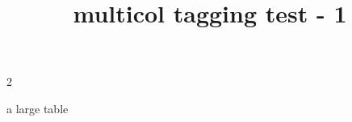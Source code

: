\documentclass{article}
\title{multicol tagging test - 1}
\begin{document}
\begin{multicols}{2}
\kant[1-2]
\begin{table}
a large table
\caption{Some caption}
\end{table}
\kant[3-4]
\end{multicols}
\end{document}

